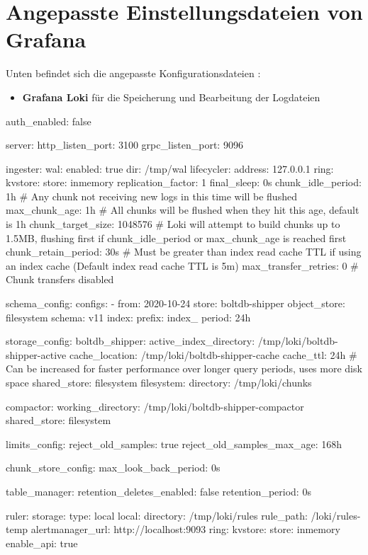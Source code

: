 \section{Angepasste Einstellungsdateien von Grafana}\label{appendix:AngepasstGrafana}

Unten befindet sich die angepasste Konfigurationsdateien \citep{Polinowski_PGL}:

\begin{itemize}[noitemsep]
    \item \textbf{Grafana Loki} für die Speicherung und Bearbeitung der Logdateien
\end{itemize}

{
\begin{spverbatim}
    auth_enabled: false

    server:
      http_listen_port: 3100
      grpc_listen_port: 9096
    
    ingester:
      wal:
        enabled: true
        dir: /tmp/wal
      lifecycler:
        address: 127.0.0.1
        ring:
          kvstore:
            store: inmemory
          replication_factor: 1
        final_sleep: 0s
      chunk_idle_period: 1h       # Any chunk not receiving new logs in this time will be flushed
      max_chunk_age: 1h           # All chunks will be flushed when they hit this age, default is 1h
      chunk_target_size: 1048576  # Loki will attempt to build chunks up to 1.5MB, flushing first if chunk_idle_period or max_chunk_age is reached first
      chunk_retain_period: 30s    # Must be greater than index read cache TTL if using an index cache (Default index read cache TTL is 5m)
      max_transfer_retries: 0     # Chunk transfers disabled
    
    schema_config:
      configs:
        - from: 2020-10-24
          store: boltdb-shipper
          object_store: filesystem
          schema: v11
          index:
            prefix: index_
            period: 24h
    
    storage_config:
      boltdb_shipper:
        active_index_directory: /tmp/loki/boltdb-shipper-active
        cache_location: /tmp/loki/boltdb-shipper-cache
        cache_ttl: 24h         # Can be increased for faster performance over longer query periods, uses more disk space
        shared_store: filesystem
      filesystem:
        directory: /tmp/loki/chunks
    
    compactor:
      working_directory: /tmp/loki/boltdb-shipper-compactor
      shared_store: filesystem
    
    limits_config:
      reject_old_samples: true
      reject_old_samples_max_age: 168h
    
    chunk_store_config:
      max_look_back_period: 0s
    
    table_manager:
      retention_deletes_enabled: false
      retention_period: 0s
    
    ruler:
      storage:
        type: local
        local:
          directory: /tmp/loki/rules
      rule_path: /loki/rules-temp
      alertmanager_url: http://localhost:9093
      ring:
        kvstore:
          store: inmemory
      enable_api: true
\end{spverbatim}
}

